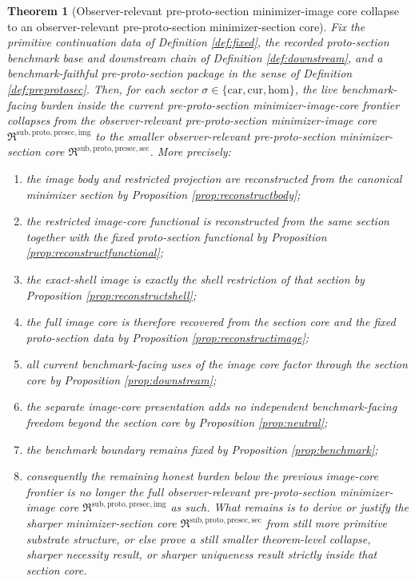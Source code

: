 \documentclass[11pt]{article}
\newcommand{\Car}{\mathrm{car}}
\newcommand{\Cur}{\mathrm{cur}}
\newcommand{\Hom}{\mathrm{hom}}
\newcommand{\PreProtoSectionImageCore}{\mathfrak R^{\mathrm{sub,proto,presec,img}}}
\newcommand{\PreProtoSectionMinSectionCore}{\mathfrak R^{\mathrm{sub,proto,presec,sec}}}
\newtheorem{theorem}{Theorem}
\begin{document}
\begin{theorem}[Observer-relevant pre-proto-section minimizer-image core collapse to an observer-relevant pre-proto-section minimizer-section core]
\label{thm:main}
Fix the primitive continuation data of Definition \ref{def:fixed}, the recorded proto-section benchmark base and downstream chain of Definition \ref{def:downstream}, and a benchmark-faithful pre-proto-section package in the sense of Definition \ref{def:preprotosec}. Then, for each sector \(\sigma\in\{\Car,\Cur,\Hom\}\), the live benchmark-facing burden inside the current pre-proto-section minimizer-image-core frontier collapses from the observer-relevant pre-proto-section minimizer-image core \(\PreProtoSectionImageCore\) to the smaller observer-relevant pre-proto-section minimizer-section core \(\PreProtoSectionMinSectionCore\). More precisely:
\begin{enumerate}
    \item the image body and restricted projection are reconstructed from the canonical minimizer section by Proposition \ref{prop:reconstructbody};
    \item the restricted image-core functional is reconstructed from the same section together with the fixed proto-section functional by Proposition \ref{prop:reconstructfunctional};
    \item the exact-shell image is exactly the shell restriction of that section by Proposition \ref{prop:reconstructshell};
    \item the full image core is therefore recovered from the section core and the fixed proto-section data by Proposition \ref{prop:reconstructimage};
    \item all current benchmark-facing uses of the image core factor through the section core by Proposition \ref{prop:downstream};
    \item the separate image-core presentation adds no independent benchmark-facing freedom beyond the section core by Proposition \ref{prop:neutral};
    \item the benchmark boundary remains fixed by Proposition \ref{prop:benchmark};
    \item consequently the remaining honest burden below the previous image-core frontier is no longer the full observer-relevant pre-proto-section minimizer-image core \(\PreProtoSectionImageCore\) as such. What remains is to derive or justify the sharper minimizer-section core \(\PreProtoSectionMinSectionCore\) from still more primitive substrate structure, or else prove a still smaller theorem-level collapse, sharper necessity result, or sharper uniqueness result strictly inside that section core.
\end{enumerate}
\end{theorem}
\end{document}
